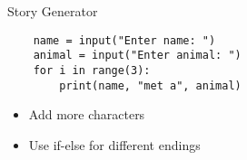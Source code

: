 \begin{frame}[fragile]{Story Generator}
    \begin{lstlisting}
    name = input("Enter name: ")
    animal = input("Enter animal: ")
    for i in range(3):
        print(name, "met a", animal)
    \end{lstlisting}
  
    \pause
    \begin{itemize}
      \item Add more characters
      \item Use if-else for different endings
    \end{itemize}
  \end{frame}